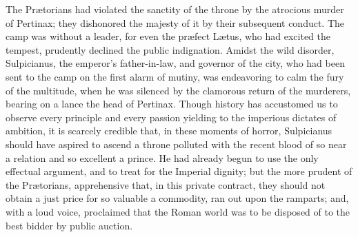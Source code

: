 


The Prætorians had violated the sanctity of the throne by the
atrocious murder of Pertinax; they dishonored the majesty of it
by their subsequent conduct. The camp was without a leader, for
even the præfect Lætus, who had excited the tempest, prudently
declined the public indignation. Amidst the wild disorder,
Sulpicianus, the emperor’s father-in-law, and governor of the
city, who had been sent to the camp on the first alarm of mutiny,
was endeavoring to calm the fury of the multitude, when he was
silenced by the clamorous return of the murderers, bearing on a
lance the head of Pertinax. Though history has accustomed us to
observe every principle and every passion yielding to the
imperious dictates of ambition, it is scarcely credible that, in
these moments of horror, Sulpicianus should have aspired to
ascend a throne polluted with the recent blood of so near a
relation and so excellent a prince. He had already begun to use
the only effectual argument, and to treat for the Imperial
dignity; but the more prudent of the Prætorians, apprehensive
that, in this private contract, they should not obtain a just
price for so valuable a commodity, ran out upon the ramparts;
and, with a loud voice, proclaimed that the Roman world was to be
disposed of to the best bidder by public auction.\footnotemark[10]



